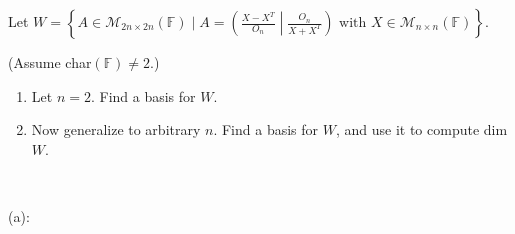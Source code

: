 \documentclass{article}
\theoremstyle{plain} %
\numberwithin{thm}{section} %
\theoremstyle{definition}
\begin{document}
\begin{question}{6}
        \tcblower


    \end{question}
    \newpage
    \begin{question}{7}
        Let \( W = \left\{ A \in \mathcal{M}_{2n \times 2n}(\mathbb{F}) \mid A = \left( \frac{X - X^T}{O_n} \middle| \frac{O_n}{X + X^T} \right) \text{ with } X \in \mathcal{M}_{n \times n}(\mathbb{F}) \right\} \).
        
        (Assume char\((\mathbb{F})\neq 2\).)
        
        \begin{enumerate}[label=(\alph*)]
            \item Let \( n = 2 \). Find a basis for \( W \).
            \item Now generalize to arbitrary \( n \). Find a basis for \( W \), and use it to compute dim \( W \).
        \end{enumerate}

        \tcblower
        \ 

        (a):


\end{question}
\end{document}
